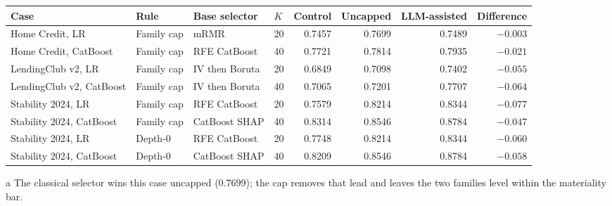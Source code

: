 \documentclass[final,5p,twocolumn]{elsarticle}
\newcommand{\Kfeat}{K}
\providecommand{\DIFaddtex}[1]{{\protect\color{blue} \sf #1}} %
\providecommand{\DIFaddFL}[1]{\DIFadd{#1}} %
\providecommand{\DIFaddendFL}{} %
\providecommand{\DIFadd}[1]{\texorpdfstring{\DIFaddtex{#1}}{#1}} %
\begin{document}
\begin{table}[htbp]
\begin{threeparttable}
\setlength{\tabcolsep}{5pt}
\begin{tabular}{@{}llllrrrr@{}}
\toprule
Case & Rule & Base selector & $\Kfeat$ & Control & Uncapped & LLM-assisted & Difference \\
\midrule
Home Credit, LR & Family cap & mRMR & 20 & 0.7457 & 0.7699 & 0.7489 & $-0.003$\tnote{a} \\
Home Credit, CatBoost & Family cap & RFE CatBoost & 40 & 0.7721 & 0.7814 & 0.7935 & $-0.021$ \\
LendingClub v2, LR & Family cap & IV then Boruta & 20 & 0.6849 & 0.7098 & 0.7402 & $-0.055$ \\
LendingClub v2, CatBoost & Family cap & IV then Boruta & 40 & 0.7065 & 0.7201 & 0.7707 & $-0.064$ \\
Stability 2024, LR & Family cap & RFE CatBoost & 20 & 0.7579 & 0.8214 & 0.8344 & $-0.077$ \\
Stability 2024, CatBoost & Family cap & CatBoost SHAP & 40 & 0.8314 & 0.8546 & 0.8784 & $-0.047$ \\
\addlinespace
Stability 2024, LR & Depth-0 & RFE CatBoost & 20 & 0.7748 & 0.8214 & 0.8344 & $-0.060$ \\
Stability 2024, CatBoost & Depth-0 & CatBoost SHAP & 40 & 0.8209 & 0.8546 & 0.8784 & $-0.058$ \\
\bottomrule
\end{tabular}
\begin{tablenotes}\footnotesize
\item[\DIFaddFL{a}] \DIFaddFL{The classical selector wins this case uncapped (0.7699); the cap removes that lead and leaves the two families level within the materiality bar.
}\end{tablenotes}
\DIFaddendFL \end{threeparttable}
\end{table}
\end{document}
